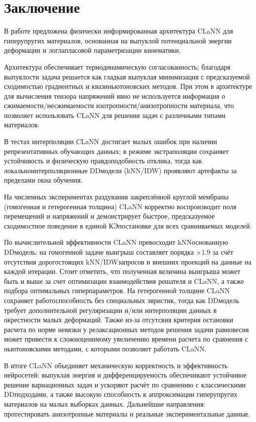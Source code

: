 \section{Заключение}

В работе предложена физически информированная архитектура CLaNN для гиперупругих материалов, основанная на выпуклой
потенциальной энергии деформации и лог\textendash лапласовой параметризации кинематики.

Архитектура обеспечивает термодинамическую согласованность; благодаря
выпуклости задача решается как гладкая выпуклая минимизация с предсказуемой сходимостью градиентных и
квазиньютоновских методов. 
При этом в архитектуре для вычисления тензора напряжений явно не используется информация о сжимаемости/несжимаемости изотропности/анизотропности
материала, что позволяет использовать CLaNN для решения задач с различными типами материалов.

В тестах интерполяции CLaNN достигает малых ошибок при наличии репрезентативных обучающих данных; в режиме
экстраполяции сохраняет устойчивость и физическую правдоподобность отклика,
тогда как локально\textendash интерполяционные DD\textendash модели (k\textendash NN/IDW) проявляют артефакты за пределами окна обучения.

На численных экспериментах раздувания закреплённой круглой мембраны (гомогенная и гетерогенная толщина) CLaNN корректно
воспроизводит поля перемещений и напряжений и демонстрирует быстрое, предсказуемое сходимостное поведение в единой
КЭ\textendash постановке для всех сравниваемых моделей.

По вычислительной эффективности CLaNN превосходит kNN\textendash основанную DD\textendash модель: на гомогенной задаче выигрыш составляет
порядка $\times 1.9$ за счёт отсутствия дорогостоящих k\textendash NN/IDW\textendash запросов и внешних проекций на данные на каждой итерации. 
Стоит отметить, что полученная величина выигрыша может быть и выше за счет оптимизации взаимодействия решателя и CLaNN, а также подбора оптимальных гиперпараметров.
На гетерогенной толщине CLaNN сохраняет работоспособность без специальных эвристик, 
тогда как DD\textendash модель требует дополнительной регуляризации и/или интерполяции данных в окрестности малых деформаций.
Также из-за отсутсвия критерия остановки расчета по норме невязки у релаксационных методов решения задачи равновесия может привести к сложноценимому увеличению времени расчета
по сравнения с ньютоновскими методами, с которыми позволяет работать CLaNN.

В итоге CLaNN объединяет механическую корректность и эффективность нейросетей: выпуклая энергия и дифференцируемость обеспечивают устойчивое 
решение вариационных задач и ускоряют расчёт по сравнению с классическими DD\textendash подходами, а также высокую способность к аппроксимации гиперупругих материалов
на малых выборках данных. 
Дальнейшие направления: протестировать анизотропные материалы и реальные экспериментальные данные.


